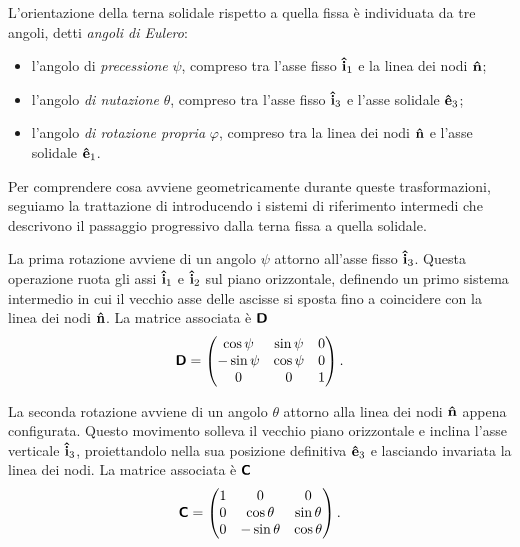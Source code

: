 \begin{definition}
    L'orientazione della terna solidale rispetto a quella fissa è individuata da tre angoli, detti \emph{angoli di Eulero}:
    \begin{itemize}
        \item l'angolo di \emph{precessione} $\psi$, compreso tra l'asse fisso $\vu{i}_1$ e la linea dei nodi $\vu{n}$;
        \item l'angolo \emph{di nutazione} $\theta$, compreso tra l'asse fisso $\vu{i}_3$ e l'asse solidale $\vu{e}_3$;
        \item l'angolo \emph{di rotazione propria} $\varphi$, compreso tra la linea dei nodi $\vu{n}$ e l'asse solidale $\vu{e}_1$.
    \end{itemize}
\end{definition}

Per comprendere cosa avviene geometricamente durante queste trasformazioni, seguiamo la trattazione di  introducendo i sistemi di riferimento intermedi che descrivono il passaggio progressivo dalla terna fissa a quella solidale.

La prima rotazione avviene di un angolo $\psi$ attorno all'asse fisso $\vu{i}_3$. Questa operazione ruota gli assi $\vu{i}_1$ e $\vu{i}_2$ sul piano orizzontale, definendo un primo sistema intermedio in cui il vecchio asse delle ascisse si sposta fino a coincidere con la linea dei nodi $\vu{n}$. La matrice associata è $\boldsymbol{\mathsf{D}}$
\begin{equation*}
    \boldsymbol{\mathsf{D}} = \begin{pmatrix} 
        \cos\psi & \sin\psi & 0 \\ 
        -\sin\psi & \cos\psi & 0 \\ 
        0 & 0 & 1 
    \end{pmatrix}.
\end{equation*}

La seconda rotazione avviene di un angolo $\theta$ attorno alla linea dei nodi $\vu{n}$ appena configurata. Questo movimento solleva il vecchio piano orizzontale e inclina l'asse verticale $\vu{i}_3$, proiettandolo nella sua posizione definitiva $\vu{e}_3$ e lasciando invariata la linea dei nodi. La matrice associata è $\boldsymbol{\mathsf{C}}$
\begin{equation*}
    \boldsymbol{\mathsf{C}} = \begin{pmatrix} 
        1 & 0 & 0 \\ 
        0 & \cos\theta & \sin\theta \\ 
        0 & -\sin\theta & \cos\theta 
    \end{pmatrix}.
\end{equation*}

